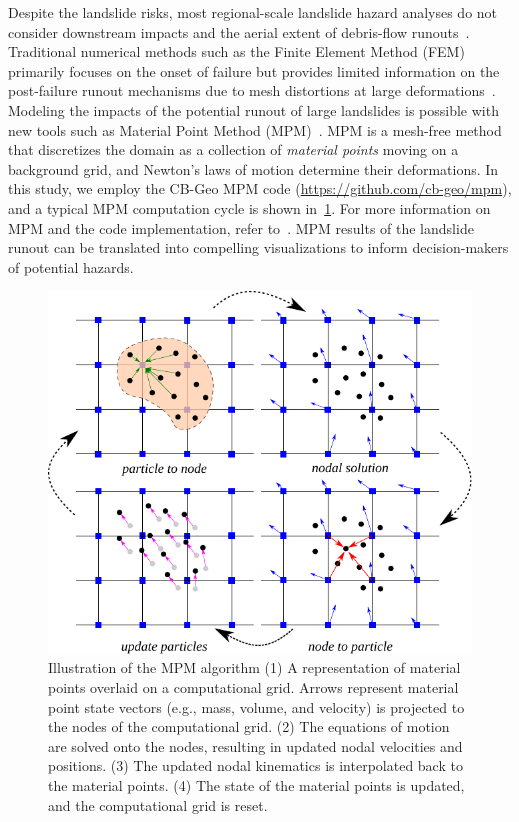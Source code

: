 \documentclass[journal]{IEEEtran}
\begin{document}
Despite the landslide risks, most regional-scale landslide hazard analyses do not consider downstream impacts and the aerial extent of debris-flow runouts~\cite{USGS2017debris}. Traditional numerical methods such as the Finite Element Method (FEM) primarily focuses on the onset of failure but provides limited information on the post-failure runout mechanisms due to mesh distortions at large  deformations~\cite{soga2016trends}. Modeling the impacts of the potential runout of large landslides is possible with new tools such as Material Point Method (MPM)~\cite{kumar2019scalable}. MPM is a mesh-free method that discretizes the domain as a collection of \textit{material points} moving on a background grid, and Newton's laws of motion determine their deformations. In this study, we employ the CB-Geo MPM code (\url{https://github.com/cb-geo/mpm}), and a typical MPM computation cycle is shown in~\cref{fig:mpm}. For more information on MPM and the code implementation, refer to~\cite{kumar2019scalable}. MPM results of the landslide runout can be translated into compelling visualizations to inform decision-makers of potential hazards. 


\begin{figure}[!htbp]
    \centering
    \includegraphics[width=\linewidth]{figs/mpm.pdf}
    \caption{Illustration of the MPM algorithm (1) A representation of material points overlaid on a computational grid. Arrows represent material point state vectors (e.g., mass, volume, and velocity) is projected to the nodes of the computational grid. (2) The equations of motion are solved onto the nodes, resulting in updated nodal velocities and positions. (3) The updated nodal kinematics is interpolated back to the material points. (4) The state of the material points is updated, and the computational grid is reset.}
    \label{fig:mpm}
\end{figure}
\end{document}
